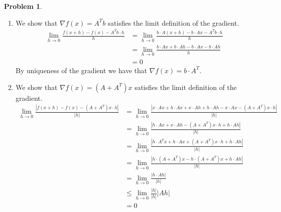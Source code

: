 \documentclass[12pt, a4paper]{article}
\newtheorem{problem}{Problem}
\theoremstyle{definition}
\newcommand{\penum}{ \begin{enumerate}[label=\bf(\alph*), leftmargin=0pt]}
\newcommand{\epenum}{ \end{enumerate} }
\newcommand{\grad}{\nabla}
\begin{document}
\newpage
\begin{problem}
\end{problem}
\penum
\item We show that $\grad f(x) = A^T b$ satisfies the limit definition of the gradient. 
\begin{align*}
	\lim_{h \to 0} \frac{f(x+h) - f(x)- A^Tb \cdot h}{h} & = \lim_{h \to 0} \frac{b \cdot A(x+h) - b \cdot Ax - A^Tb \cdot h}{h}
	\\ & = \lim_{h \to 0} \frac{b \cdot Ax + b \cdot Ah - b \cdot Ax - b \cdot Ah}{h} \tag{since $A^Tb = b \cdot A$}
	\\ & = 0
\end{align*}
By uniqueness of the gradient we have that $\grad f(x) = b \cdot A^T$. 
\item We show that $\grad f (x) = (A+A^T)x$ satisfies the limit definition of the gradient. 
\begin{align*}
	\lim_{h \to 0} \frac{|f(x+h) - f(x)- (A+ A^T)x\cdot h|}{|h|}
	  &= \lim_{h \to 0}\frac{|x \cdot A x + h \cdot Ax + x \cdot Ah + h \cdot A h - x \cdot Ax -(A+ A^T)x\cdot h| }{|h|}
	  \\ & = \lim_{h \to 0} \frac{|h \cdot A x + x \cdot Ah - (A+A^T)x \cdot h + h \cdot Ah|}{|h|}
	  \\ & = \lim_{h \to 0 } \frac{|h \cdot A^T x + h \cdot Ax +  (A+A^T)x\cdot h + h \cdot Ah|}{|h|}
	  \\ & = \lim_{h\to 0} \frac{|h \cdot(A+A^T)x - h \cdot (A+A^T)x + h \cdot Ah|}{|h|}
	  \\ & = \lim_{h\to 0 } \frac{|h \cdot Ah|}{|h|}
	  \\ & \leq \lim_{h\to 0} \frac{|h|}{|h|} |Ah| \tag{By Cauchy-Schwarz}
	  \\  & = 0 \tag{since linear maps are continuous}
\end{align*}
\epenum 
\newpage
\end{document}
